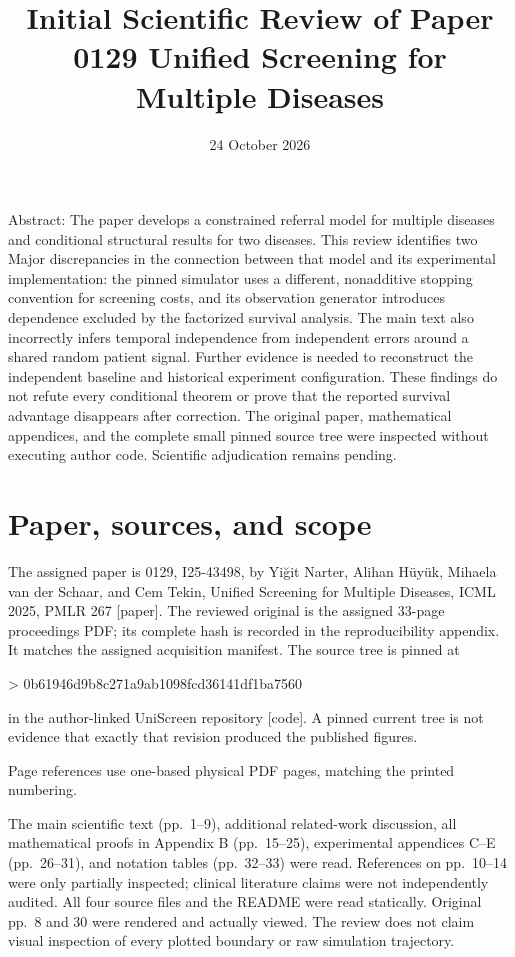 \documentclass[10pt]{article}
\title{Initial Scientific Review of Paper 0129
Unified Screening for Multiple Diseases}
\author{}
\date{24 October 2026}
\begin{document}
\maketitle
Abstract: The paper develops a constrained referral model for multiple diseases and conditional structural results for two diseases. This review identifies two Major discrepancies in the connection between that model and its experimental implementation: the pinned simulator uses a different, nonadditive stopping convention for screening costs, and its observation generator introduces dependence excluded by the factorized survival analysis. The main text also incorrectly infers temporal independence from independent errors around a shared random patient signal. Further evidence is needed to reconstruct the independent baseline and historical experiment configuration. These findings do not refute every conditional theorem or prove that the reported survival advantage disappears after correction. The original paper, mathematical appendices, and the complete small pinned source tree were inspected without executing author code. Scientific adjudication remains pending.\par
\section*{Paper, sources, and scope}
The assigned paper is 0129, I25-43498, by Yiğit Narter, Alihan Hüyük, Mihaela van der Schaar, and Cem Tekin, Unified Screening for Multiple Diseases, ICML 2025, PMLR 267 [paper]. The reviewed original is the assigned 33-page proceedings PDF; its complete hash is recorded in the reproducibility appendix. It matches the assigned acquisition manifest. The source tree is pinned at\par
> 0b61946d9b8c271a9ab1098fcd36141df1ba7560\par
in the author-linked UniScreen repository [code]. A pinned current tree is not evidence that exactly that revision produced the published figures.\par
Page references use one-based physical PDF pages, matching the printed numbering.\par
The main scientific text (pp. 1–9), additional related-work discussion, all mathematical proofs in Appendix B (pp. 15–25), experimental appendices C–E (pp. 26–31), and notation tables (pp. 32–33) were read. References on pp. 10–14 were only partially inspected; clinical literature claims were not independently audited. All four source files and the README were read statically. Original pp. 8 and 30 were rendered and actually viewed. The review does not claim visual inspection of every plotted boundary or raw simulation trajectory.\par
\end{document}
